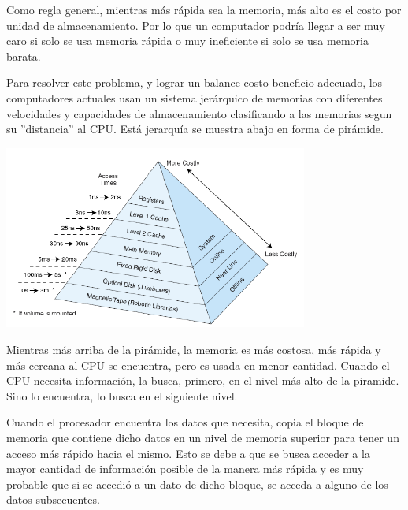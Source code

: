 Como regla general, mientras más rápida sea la memoria, más alto es el costo por unidad de almacenamiento. Por lo que un computador podría llegar a ser muy caro si solo se usa memoria rápida o muy ineficiente si solo se usa memoria barata.

Para resolver este problema, y lograr un balance costo-beneficio adecuado, los computadores actuales usan un sistema jerárquico de memorias con diferentes velocidades y capacidades de almacenamiento clasificando a las memorias segun su ''distancia'' al CPU. Está jerarquía se muestra abajo en forma de pirámide.

\begin{center}
	\includegraphics[width=10cm, keepaspectratio=yes]{imagenes/piramide.PNG}
\end{center}

Mientras más arriba de la pirámide, la memoria es más costosa, más rápida y más cercana al CPU se encuentra, pero es usada en menor cantidad. Cuando el CPU necesita información, la busca, primero, en el nivel más alto de la piramide. Sino lo encuentra, lo busca en el siguiente nivel.

Cuando el procesador encuentra los datos que necesita, copia el bloque de memoria que contiene dicho datos en un nivel de memoria superior para tener un acceso más rápido hacia el mismo. Esto se debe a que se busca acceder a la mayor cantidad de información posible de la manera más rápida y es muy probable que si se accedió a un dato de dicho bloque, se acceda a alguno de los datos subsecuentes.

